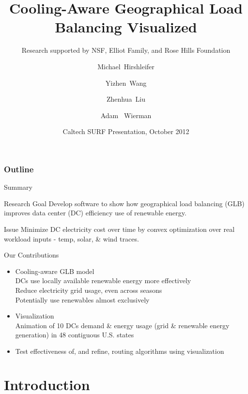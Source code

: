 \documentclass[xcolor=dvipsnames]{beamer}
\title{Cooling-Aware Geographical Load Balancing Visualized}
\subtitle{Research supported by NSF, Elliot Family, and Rose Hills Foundation}
\author[Hirshleifer, Wang, Liu, Wierman] %
{Michael~Hirshleifer\inst{} \and Yizhen~Wang\inst{} \\ \and Zhenhua~Liu \inst{} \and Adam~ Wierman \inst{}}
\institute[Caltech] %
{
  \inst{}%
  California Institute of Technology \\
  1200 E California Blvd \\
   Pasadena, CA 91106 \\
}
\date[Support] %
{Caltech SURF Presentation, October 2012 }
\begin{document}
\frame{\titlepage}

\begin{frame}
\frametitle{Outline}
\tableofcontents[part=1,pausesections]
\end{frame}

\begin{frame}{Summary}

	\begin{block}{Research Goal}  
	Develop software to show how geographical load balancing (GLB) improves data center (DC) efficiency use of renewable energy.  
	\end{block}
	
	\begin{block}{Issue} 
	Minimize DC electricity cost over time by convex optimization over real workload inputs - temp, solar, \& wind traces.
	\end{block}

	\begin{block}{Our Contributions} 
	\begin{itemize}
		\item{Cooling-aware GLB model \\
			DCs use locally available renewable energy more effectively \\
			Reduce electricity grid usage, even across seasons \\
			Potentially use renewables almost exclusively} 
		\item{Visualization \\ 
		Animation of 10 DCs demand \& energy usage (grid \& renewable energy generation) in 48 contiguous U.S. states}  
		\item{Test effectiveness of, and refine, routing algorithms using visualization}
	\end{itemize} 
	\end{block}

\end{frame}

\section{Introduction}
\end{document}
